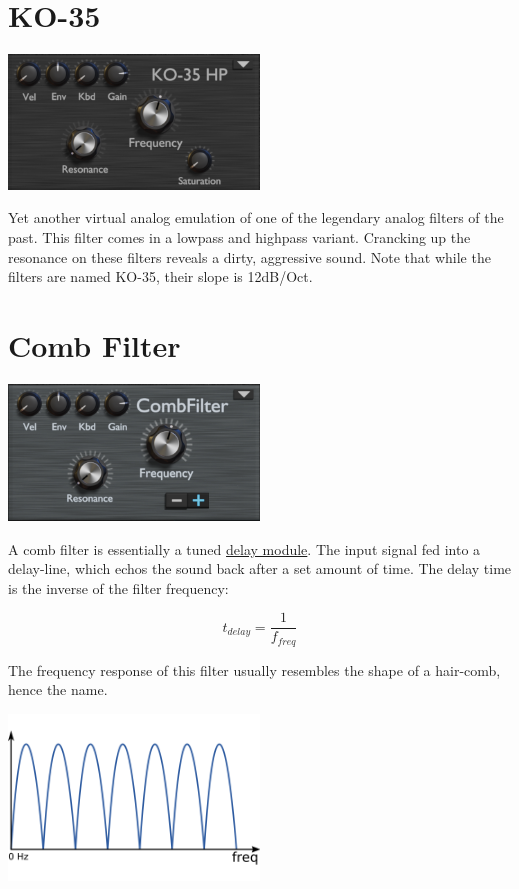 \section{KO-35}
\begin{center}
    \includegraphics[width=0.5\textwidth]{graphics/korg_filter.png}
\end{center}

Yet another virtual analog emulation of one of the legendary analog filters of the past. This filter comes in a lowpass and highpass variant. Crancking up the resonance on these filters reveals a dirty, aggressive sound. Note that while the filters are named KO-35, their slope is 12dB/Oct.

\section{Comb Filter}
\label{comb_filter}
\begin{center}
    \includegraphics[width=0.5\textwidth]{graphics/comb_filter.png}
\end{center}

A comb filter is essentially a tuned \hyperref[delay]{delay module}. The input signal fed into a delay-line, which echos the sound back after a set amount of time. The delay time is the inverse of the filter frequency:

\begin{equation}
    t_{delay} = \frac{1}{f_{freq}}
\end{equation}

The frequency response of this filter usually resembles the shape of a hair-comb, hence the name.
\begin{center}
    \includegraphics[width=0.5\textwidth]{graphics/comb_response.png}
\end{center}

